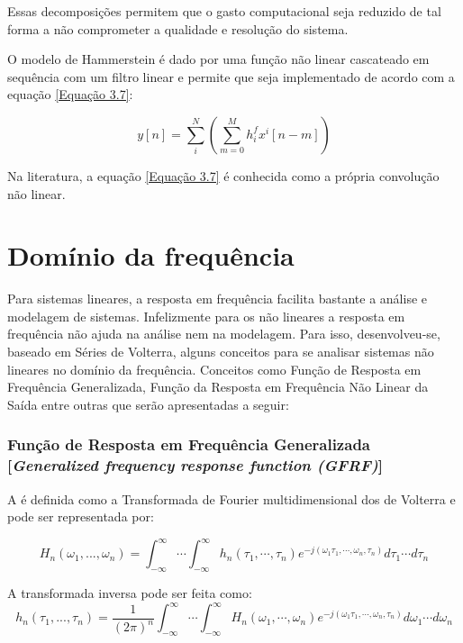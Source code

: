 Essas decomposições permitem que o gasto computacional seja reduzido de tal forma a não comprometer a qualidade e resolução do sistema\cite{mavcak2012real}.

O modelo de Hammerstein é dado por uma função não linear cascateado em sequência com um filtro linear e permite que seja implementado de acordo com a equação \ref{Equação 3.7}:

\begin{equation}
y[n] = \sum_{i}^{N}(\sum_{m=0}^{M}h_{i}^{f}x^{i}[n-m])
\label{Equação 3.7}
\end{equation}

Na literatura, a equação \ref{Equação 3.7} é conhecida como a própria convolução não linear.
\section*{Domínio da frequência}
Para sistemas lineares, a resposta em frequência facilita bastante a análise e modelagem de sistemas. Infelizmente para os não lineares a resposta em frequência não ajuda na análise nem na modelagem. Para isso, desenvolveu-se, baseado em Séries de Volterra, alguns conceitos para se analisar sistemas não lineares no domínio da frequência. Conceitos como Função de Resposta em Frequência Generalizada, Função da Resposta em Frequência Não Linear da Saída entre outras que serão apresentadas a seguir:
\subsubsection*{Função de Resposta em Frequência Generalizada [\textit{Generalized frequency response function (GFRF)}]}
A \FRFG  é definida como a Transformada de Fourier multidimensional dos  de Volterra e pode ser representada por:

\begin{equation}
H_{n}(\omega_{1},...,\omega_{n}) = \int_{- \infty}^{\infty}\cdots \int_{- \infty}^{\infty}h_{n}(\tau_{1},\cdots,\tau_{n})e^{-j(\omega_{1}\tau_{1},\cdots,\omega_{n},\tau_{n})}d\tau_{1}\cdots d\tau_{n}
\label{Equação 3.8}
\end{equation}

A transformada inversa pode ser feita como:
\begin{equation}
h_{n}(\tau_{1},...,\tau_{n}) = \dfrac{1}{(2\pi)^{n}}\int_{- \infty}^{\infty}\cdots \int_{- \infty}^{\infty}H_{n}(\omega_{1},\cdots,\omega_{n})e^{-j(\omega_{1}\tau_{1},\cdots,\omega_{n},\tau_{n})}d\omega_{1}\cdots d\omega_{n}
\label{Equação 3.9}
\end{equation}

